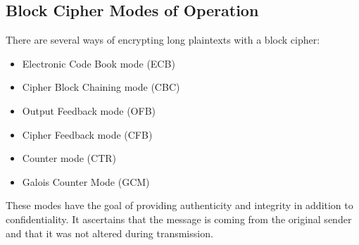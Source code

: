 \documentclass{math}
\begin{document}
\subsection*{Block Cipher Modes of Operation}
There are several ways of encrypting long plaintexts with a block cipher:
\begin{itemize}
  \item Electronic Code Book mode (ECB)
  \item Cipher Block Chaining mode (CBC)
  \item Output Feedback mode (OFB)
  \item Cipher Feedback mode (CFB)
  \item Counter mode (CTR)
  \item Galois Counter Mode (GCM)
\end{itemize}
These modes have the goal of providing authenticity and integrity in addition to
confidentiality. It ascertains that the message is coming from the original
sender and that it was not altered during transmission.
\end{document}

